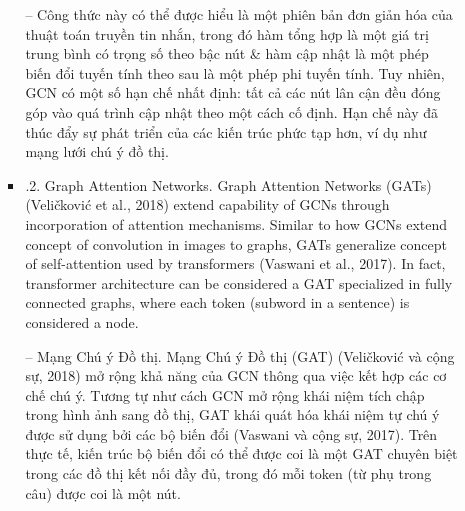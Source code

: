 \documentclass{article}
\begin{document}
\begin{itemize}
\begin{itemize}
\begin{itemize}
            -- Công thức này có thể được hiểu là một phiên bản đơn giản hóa của thuật toán truyền tin nhắn, trong đó hàm tổng hợp là một giá trị trung bình có trọng số theo bậc nút \& hàm cập nhật là một phép biến đổi tuyến tính theo sau là một phép phi tuyến tính. Tuy nhiên, GCN có một số hạn chế nhất định: tất cả các nút lân cận đều đóng góp vào quá trình cập nhật theo một cách cố định. Hạn chế này đã thúc đẩy sự phát triển của các kiến trúc phức tạp hơn, ví dụ như mạng lưới chú ý đồ thị.
            \item {.2. Graph Attention Networks.} Graph Attention Networks (GATs) (Veličković et al., 2018) extend capability of GCNs through incorporation of attention mechanisms. Similar to how GCNs extend concept of convolution in images to graphs, GATs generalize concept of self-attention used by transformers (Vaswani et al., 2017). In fact, transformer architecture can be considered a GAT specialized in fully connected graphs, where each token (subword in a sentence) is considered a node.

            -- {\sf Mạng Chú ý Đồ thị.} Mạng Chú ý Đồ thị (GAT) (Veličković và cộng sự, 2018) mở rộng khả năng của GCN thông qua việc kết hợp các cơ chế chú ý. Tương tự như cách GCN mở rộng khái niệm tích chập trong hình ảnh sang đồ thị, GAT khái quát hóa khái niệm tự chú ý được sử dụng bởi các bộ biến đổi (Vaswani và cộng sự, 2017). Trên thực tế, kiến trúc bộ biến đổi có thể được coi là một GAT chuyên biệt trong các đồ thị kết nối đầy đủ, trong đó mỗi token (từ phụ trong câu) được coi là một nút.


\end{itemize}
\end{itemize}
\end{itemize}
\end{document}
